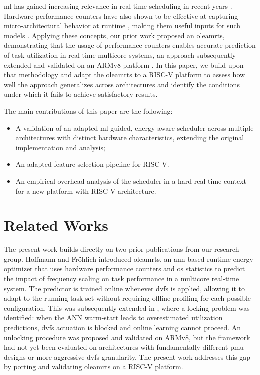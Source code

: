 \documentclass[journal]{IEEEtran}
\begin{document}
\gls{ml} has gained increasing relevance in real-time scheduling in recent years \cite{rahim2025survey, ul2018task}. Hardware performance counters have also shown to be effective at capturing micro-architectural behavior at runtime \cite{mazzola2022data}, making them useful inputs for such models \cite{hoffmann2021online}. Applying these concepts, our prior work \cite{hoffmann2021online} proposed an \gls{oleamrts}, demonstrating that the usage of performance counters enables accurate prediction of task utilization in real-time multicore systems, an approach subsequently extended and validated on an ARMv8 platform \cite{hoffmann2024lightweight}. In this paper, we build upon that methodology and adapt the \gls{oleamrts} to a RISC-V platform to assess how well the approach generalizes across architectures and identify the conditions under which it fails to achieve satisfactory results.

The main contributions of this paper are the following:
\begin{itemize}
    \item A validation of an adapted \gls{ml}-guided, energy-aware scheduler across multiple architectures with distinct hardware characteristics, extending the original implementation and analysis;
    \item An adapted feature selection pipeline for RISC-V.
    \item An empirical overhead analysis of the scheduler in a hard real-time context for a new platform with RISC-V architecture.
\end{itemize}

\section{Related Works}

The present work builds directly on two prior publications from our research group. Hoffmann and Fröhlich \cite{hoffmann2021online} introduced \gls{oleamrts}, an \acrfull{ann}-based runtime energy optimizer that uses hardware performance counters and \gls{os} statistics to predict the impact of frequency scaling on task performance in a multicore real-time system. The predictor is trained online whenever \gls{dvfs} is applied, allowing it to adapt to the running task-set without requiring offline profiling for each possible configuration. This was subsequently extended in \cite{hoffmann2024lightweight}, where a locking problem was identified: when the ANN warm-start leads to overestimated utilization predictions, \gls{dvfs} actuation is blocked and online learning cannot proceed. An unlocking procedure was proposed and validated on ARMv8, but the framework had not yet been evaluated on architectures with fundamentally different \gls{pmu} designs or more aggressive \gls{dvfs} granularity. The present work addresses this gap by porting and validating \gls{oleamrts} on a RISC-V platform.
\end{document}
